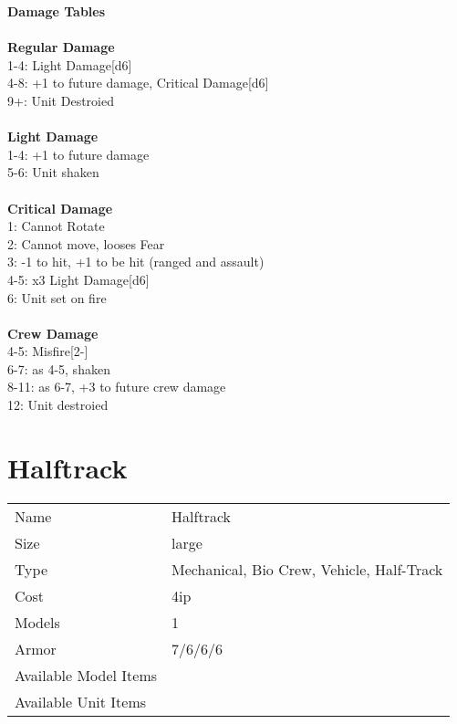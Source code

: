 {\bf Damage Tables} \\
\ \\ {\bf Regular Damage } \\
1-4: Light Damage[d6] \\
4-8: +1 to future damage, Critical Damage[d6] \\
9+: Unit Destroied \\
\ \\ {\bf Light Damage } \\
1-4: +1 to future damage \\
5-6: Unit shaken \\
\ \\ {\bf Critical Damage } \\
1: Cannot Rotate \\
2: Cannot move, looses Fear \\
3: -1 to hit, +1 to be hit (ranged and assault) \\
4-5: x3 Light Damage[d6] \\
6: Unit set on fire \\
\ \\ {\bf Crew Damage } \\
4-5: Misfire[2-] \\
6-7: as 4-5, shaken \\
8-11: as 6-7, +3 to future crew damage \\
12: Unit destroied \\









\pagebreak

\section{ Halftrack }

\begin{tabular}{ll}
  Name & Halftrack \\
  Size & large\\
  Type & Mechanical, Bio Crew, Vehicle, Half-Track\\
  Cost & 4ip\\
  Models & 1\\
  Armor & 7/6/6/6\\
  Available Model Items &  \\
  Available Unit Items &  \\
\end{tabular}

